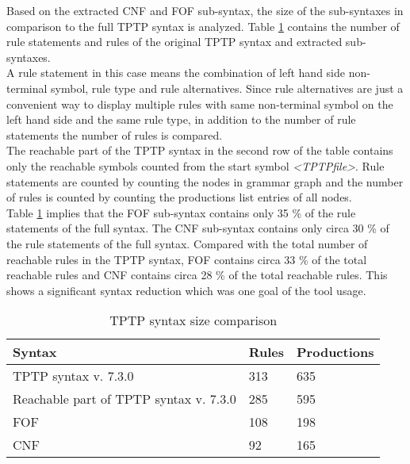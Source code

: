 Based on the extracted CNF and FOF sub-syntax, the size of the sub-syntaxes in comparison to the full TPTP syntax is analyzed.
Table \ref{tbl:EvaluationSyntaxSize} contains the number of rule statements and rules of the original TPTP syntax and extracted sub-syntaxes.\\
A rule statement in this case means the combination of left hand side non-terminal symbol, rule type and rule alternatives.
Since rule alternatives are just a convenient way to display multiple rules with same non-terminal symbol on the left hand side and the same rule type, in addition to the number of rule statements the number of rules is compared.\\
The reachable part of the TPTP syntax in the second row of the table contains only the reachable symbols counted from the start symbol \textit{\textless TPTP\textunderscore file\textgreater}. Rule statements are counted by counting the nodes in grammar graph and the number of rules is counted by counting the productions list entries of all nodes.\\
Table \ref{tbl:EvaluationSyntaxSize} implies that the FOF sub-syntax contains only 35 \% of the rule statements of the full syntax.
The CNF sub-syntax contains only circa 30 \% of the rule statements of the full syntax.
Compared with the total number of reachable rules in the TPTP syntax, FOF contains circa 33 \% of the total reachable rules and CNF contains circa  28 \% of the total reachable rules.
This shows a significant syntax reduction which was one goal of the tool usage.

\begin{table}[H]
\centering
\caption{TPTP syntax size comparison}
\begin{tabular}{lll}
\textbf{Syntax} & \textbf{Rules} & \textbf{Productions}\\\hline
TPTP syntax v. 7.3.0 & 313 & 635\\
Reachable part of TPTP syntax v. 7.3.0 & 285 & 595\\
FOF & 108 & 198\\
CNF & 92 & 165\\
\end{tabular}
\label{tbl:EvaluationSyntaxSize}
\end{table}
